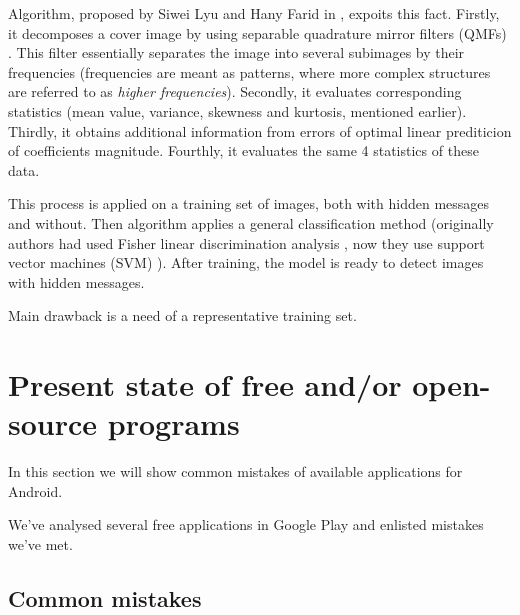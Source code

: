 Algorithm, proposed by Siwei Lyu and Hany Farid in \cite{lyu2002detecting}, expoits this fact.
Firstly, it decomposes a cover image by using separable quadrature mirror filters (QMFs) \cite{vaidyanathan1987quadrature}.
This filter essentially separates the image into several subimages by their frequencies (frequencies are meant as patterns,
where more complex structures are referred to as \emph{higher frequencies}).
Secondly, it evaluates corresponding statistics (mean value, variance, skewness and kurtosis, mentioned earlier).
Thirdly, it obtains additional information from errors of optimal linear prediticion of coefficients magnitude.
Fourthly, it evaluates the same 4 statistics of these data.

This process is applied on a training set of images, both with hidden messages and without. Then algorithm
applies a general classification method (originally authors had used Fisher linear discrimination analysis \cite{welling2005fisher}, now
they use support vector machines (SVM) \cite{vapnik2013nature}). After training, the model is ready to detect images with hidden messages.

Main drawback is a need of a representative training set. 



\section{Present state of free and/or open-source programs}
In this section we will show common mistakes of available applications for Android.

We've analysed several free applications in Google Play 
\cite{app0,app1,app2,app3,app4,app5,app7,app8,app9,app10,app11,app12,app13,app14,app15,app16,app17,app18,app19} 
and enlisted mistakes we've met.

\subsection{Common mistakes}

